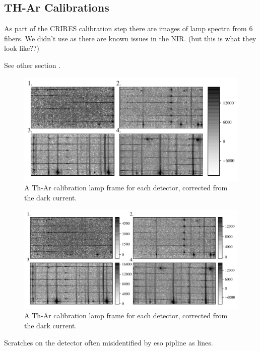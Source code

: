


\subsection{TH-Ar Calibrations}
As part of the CRIRES calibration step there are images of \thar lamp spectra from 6 fibers.
We didn't use as there are known issues in the NIR. (but this is what they look like??)

See other section .

\begin{figure}
\includegraphics[width=\hsize]{./figures/reduction/lamp_plots.pdf}
    \caption{A Th-Ar calibration lamp frame for each detector, corrected from the dark current.}
    \label{fig:caliblamps}
\end{figure}

\begin{figure}
\includegraphics[width=\hsize]{./figures/reduction/lamp_plots_cbar_each.pdf}
    \caption{A Th-Ar calibration lamp frame for each detector, corrected from the dark current.}
    \label{fig:caliblamps2}
\end{figure}
Scratches on the detector often misidentified by eso pipline as \thar lines.


